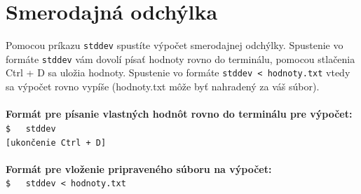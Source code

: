 \documentclass[11pt, a4paper]{article}
\begin{document}
\section{Smerodajná odchýlka}
Pomocou príkazu \verb|stddev| spustíte výpočet smerodajnej odchýlky. Spustenie vo formáte \verb|stddev| vám dovolí písať hodnoty rovno do terminálu, pomocou stlačenia Ctrl + D sa uložia hodnoty. Spustenie vo formáte \verb|stddev < hodnoty.txt| vtedy sa výpočet rovno vypíše (hodnoty.txt môže byť nahradený za váš súbor). \\ \\
\textbf{Formát pre písanie vlastných hodnôt rovno do terminálu pre výpočet:} \\
\verb|$   stddev| \\
\verb|[ukončenie Ctrl + D]| \\ \\
\textbf{Formát pre vloženie pripraveného súboru na výpočet:} \\
\verb|$   stddev < hodnoty.txt|
\end{document}
